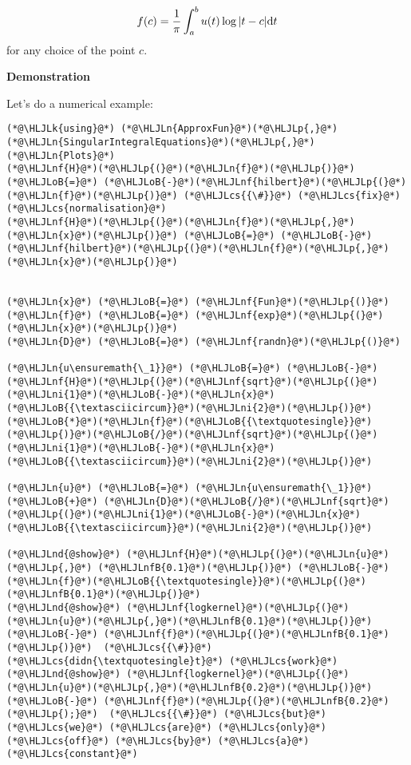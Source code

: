 \documentclass[12pt,a4paper]{article}
\newcommand{\HLJLk}[1]{\textcolor[RGB]{148,91,176}{\textbf{#1}}}
\newcommand{\HLJLn}[1]{#1}
\newcommand{\HLJLnd}[1]{\textcolor[RGB]{214,102,97}{#1}}
\newcommand{\HLJLnf}[1]{\textcolor[RGB]{66,102,213}{#1}}
\newcommand{\HLJLnfB}[1]{\textcolor[RGB]{59,151,46}{#1}}
\newcommand{\HLJLni}[1]{\textcolor[RGB]{59,151,46}{#1}}
\newcommand{\HLJLoB}[1]{\textcolor[RGB]{102,102,102}{\textbf{#1}}}
\newcommand{\HLJLp}[1]{#1}
\newcommand{\HLJLcs}[1]{\textcolor[RGB]{153,153,119}{\textit{#1}}}
\def\D{ {\rm d} }
\def\dt{\D t}
\begin{document}
\[
f(c) = {1 \over \pi} \int_a^b u(t) \log |t-c| \dt
\]
for any choice of the point  $c$.

\textbf{Demonstration}

Let's do a numerical example:


\begin{lstlisting}
(*@\HLJLk{using}@*) (*@\HLJLn{ApproxFun}@*)(*@\HLJLp{,}@*) (*@\HLJLn{SingularIntegralEquations}@*)(*@\HLJLp{,}@*) (*@\HLJLn{Plots}@*)
(*@\HLJLnf{H}@*)(*@\HLJLp{(}@*)(*@\HLJLn{f}@*)(*@\HLJLp{)}@*) (*@\HLJLoB{=}@*) (*@\HLJLoB{-}@*)(*@\HLJLnf{hilbert}@*)(*@\HLJLp{(}@*)(*@\HLJLn{f}@*)(*@\HLJLp{)}@*) (*@\HLJLcs{{\#}}@*) (*@\HLJLcs{fix}@*) (*@\HLJLcs{normalisation}@*)
(*@\HLJLnf{H}@*)(*@\HLJLp{(}@*)(*@\HLJLn{f}@*)(*@\HLJLp{,}@*)(*@\HLJLn{x}@*)(*@\HLJLp{)}@*) (*@\HLJLoB{=}@*) (*@\HLJLoB{-}@*)(*@\HLJLnf{hilbert}@*)(*@\HLJLp{(}@*)(*@\HLJLn{f}@*)(*@\HLJLp{,}@*)(*@\HLJLn{x}@*)(*@\HLJLp{)}@*)


(*@\HLJLn{x}@*) (*@\HLJLoB{=}@*) (*@\HLJLnf{Fun}@*)(*@\HLJLp{()}@*)
(*@\HLJLn{f}@*) (*@\HLJLoB{=}@*) (*@\HLJLnf{exp}@*)(*@\HLJLp{(}@*)(*@\HLJLn{x}@*)(*@\HLJLp{)}@*)
(*@\HLJLn{D}@*) (*@\HLJLoB{=}@*) (*@\HLJLnf{randn}@*)(*@\HLJLp{()}@*)

(*@\HLJLn{u\ensuremath{\_1}}@*) (*@\HLJLoB{=}@*) (*@\HLJLoB{-}@*)(*@\HLJLnf{H}@*)(*@\HLJLp{(}@*)(*@\HLJLnf{sqrt}@*)(*@\HLJLp{(}@*)(*@\HLJLni{1}@*)(*@\HLJLoB{-}@*)(*@\HLJLn{x}@*)(*@\HLJLoB{{\textasciicircum}}@*)(*@\HLJLni{2}@*)(*@\HLJLp{)}@*)(*@\HLJLoB{*}@*)(*@\HLJLn{f}@*)(*@\HLJLoB{{\textquotesingle}}@*)(*@\HLJLp{)}@*)(*@\HLJLoB{/}@*)(*@\HLJLnf{sqrt}@*)(*@\HLJLp{(}@*)(*@\HLJLni{1}@*)(*@\HLJLoB{-}@*)(*@\HLJLn{x}@*)(*@\HLJLoB{{\textasciicircum}}@*)(*@\HLJLni{2}@*)(*@\HLJLp{)}@*)

(*@\HLJLn{u}@*) (*@\HLJLoB{=}@*) (*@\HLJLn{u\ensuremath{\_1}}@*) (*@\HLJLoB{+}@*) (*@\HLJLn{D}@*)(*@\HLJLoB{/}@*)(*@\HLJLnf{sqrt}@*)(*@\HLJLp{(}@*)(*@\HLJLni{1}@*)(*@\HLJLoB{-}@*)(*@\HLJLn{x}@*)(*@\HLJLoB{{\textasciicircum}}@*)(*@\HLJLni{2}@*)(*@\HLJLp{)}@*)

(*@\HLJLnd{@show}@*) (*@\HLJLnf{H}@*)(*@\HLJLp{(}@*)(*@\HLJLn{u}@*)(*@\HLJLp{,}@*) (*@\HLJLnfB{0.1}@*)(*@\HLJLp{)}@*) (*@\HLJLoB{-}@*) (*@\HLJLn{f}@*)(*@\HLJLoB{{\textquotesingle}}@*)(*@\HLJLp{(}@*)(*@\HLJLnfB{0.1}@*)(*@\HLJLp{)}@*)
(*@\HLJLnd{@show}@*) (*@\HLJLnf{logkernel}@*)(*@\HLJLp{(}@*)(*@\HLJLn{u}@*)(*@\HLJLp{,}@*)(*@\HLJLnfB{0.1}@*)(*@\HLJLp{)}@*) (*@\HLJLoB{-}@*) (*@\HLJLnf{f}@*)(*@\HLJLp{(}@*)(*@\HLJLnfB{0.1}@*)(*@\HLJLp{)}@*)  (*@\HLJLcs{{\#}}@*) (*@\HLJLcs{didn{\textquotesingle}t}@*) (*@\HLJLcs{work}@*)
(*@\HLJLnd{@show}@*) (*@\HLJLnf{logkernel}@*)(*@\HLJLp{(}@*)(*@\HLJLn{u}@*)(*@\HLJLp{,}@*)(*@\HLJLnfB{0.2}@*)(*@\HLJLp{)}@*) (*@\HLJLoB{-}@*) (*@\HLJLnf{f}@*)(*@\HLJLp{(}@*)(*@\HLJLnfB{0.2}@*)(*@\HLJLp{);}@*)  (*@\HLJLcs{{\#}}@*) (*@\HLJLcs{but}@*) (*@\HLJLcs{we}@*) (*@\HLJLcs{are}@*) (*@\HLJLcs{only}@*) (*@\HLJLcs{off}@*) (*@\HLJLcs{by}@*) (*@\HLJLcs{a}@*) (*@\HLJLcs{constant}@*)
\end{lstlisting}
\end{document}

